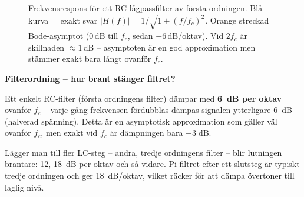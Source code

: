 \documentclass[a4paper,11pt,twoside]{book}
\begin{document}
\begin{figure}[h]
\caption{Frekvensrespons för ett RC-lågpassfilter av första ordningen.
Blå kurva = exakt svar $|H(f)| = 1/\!\sqrt{1+(f/f_c)^2}$.
Orange streckad = Bode-asymptot (0\,dB till $f_c$, sedan $-6$\,dB/oktav).
Vid $2f_c$ är skillnaden $\approx 1$\,dB -- asymptoten är en god approximation
men stämmer exakt bara långt ovanför $f_c$.}
\label{fig:rc-lp-bode}
\end{figure}

\medskip
\noindent\textbf{Filterordning -- hur brant stänger filtret?}
\medskip

Ett enkelt RC-filter (första ordningens filter) dämpar med
\textbf{6~dB per oktav} ovanför $f_c$ -- varje gång frekvensen
fördubblas dämpas signalen ytterligare 6~dB (halverad spänning).
Detta är en asymptotisk approximation som gäller väl ovanför $f_c$,
men exakt vid $f_c$ är dämpningen bara $-3\;\text{dB}$.

Lägger man till fler LC-steg -- andra, tredje ordningens filter --
blir lutningen brantare: 12, 18~dB per oktav och så vidare.
Pi-filtret efter ett slutsteg är typiskt tredje ordningen och ger
18~dB/oktav, vilket räcker för att dämpa övertoner till laglig nivå.
\end{document}
